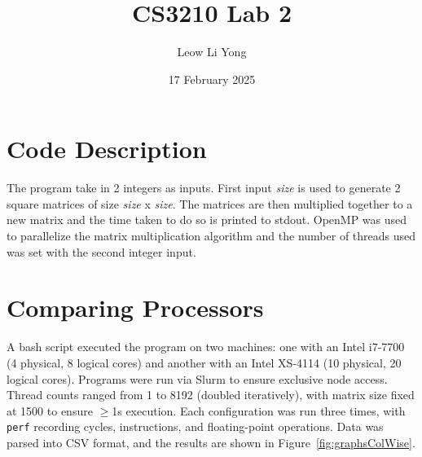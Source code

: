 \documentclass{article}
\title{CS3210 Lab 2}
\author{Leow Li Yong}
\date{17 February 2025}
\begin{document}
\captionsetup{justification=centering}
\maketitle

\section{Code Description}
The program take in 2 integers as inputs. First input \textit{size} is used to generate 2 square matrices of size \textit{size} x \textit{size}. The matrices are then multiplied together to a new matrix and the time taken to do so is printed to stdout. OpenMP was used to parallelize the matrix multiplication algorithm and the number of threads used was set with the second integer input.  

\section{Comparing Processors}
A bash script executed the program on two machines: one with an Intel i7-7700 (4 physical, 8 logical cores) and another with an Intel XS-4114 (10 physical, 20 logical cores). Programs were run via Slurm to ensure exclusive node access. Thread counts ranged from 1 to 8192 (doubled iteratively), with matrix size fixed at 1500 to ensure $\geq$1s execution. Each configuration was run three times, with \texttt{perf} recording cycles, instructions, and floating-point operations. Data was parsed into CSV format, and the results are shown in Figure~\ref{fig:graphsColWise}.
\end{document}

